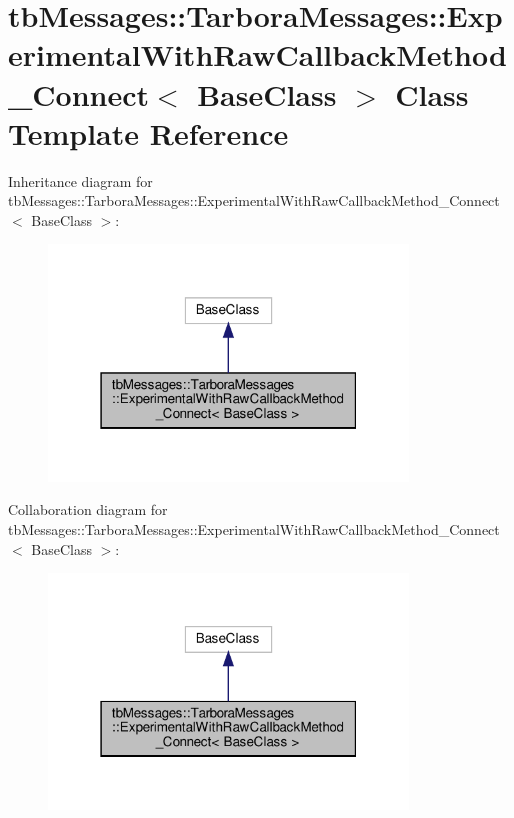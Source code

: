 \hypertarget{classtbMessages_1_1TarboraMessages_1_1ExperimentalWithRawCallbackMethod__Connect}{}\section{tb\+Messages\+:\+:Tarbora\+Messages\+:\+:Experimental\+With\+Raw\+Callback\+Method\+\_\+\+Connect$<$ Base\+Class $>$ Class Template Reference}
\label{classtbMessages_1_1TarboraMessages_1_1ExperimentalWithRawCallbackMethod__Connect}


Inheritance diagram for tb\+Messages\+:\+:Tarbora\+Messages\+:\+:Experimental\+With\+Raw\+Callback\+Method\+\_\+\+Connect$<$ Base\+Class $>$\+:
\nopagebreak
\begin{figure}[H]
\begin{center}
\leavevmode
\includegraphics[width=271pt]{classtbMessages_1_1TarboraMessages_1_1ExperimentalWithRawCallbackMethod__Connect__inherit__graph}
\end{center}
\end{figure}


Collaboration diagram for tb\+Messages\+:\+:Tarbora\+Messages\+:\+:Experimental\+With\+Raw\+Callback\+Method\+\_\+\+Connect$<$ Base\+Class $>$\+:
\nopagebreak
\begin{figure}[H]
\begin{center}
\leavevmode
\includegraphics[width=271pt]{classtbMessages_1_1TarboraMessages_1_1ExperimentalWithRawCallbackMethod__Connect__coll__graph}
\end{center}
\end{figure}
